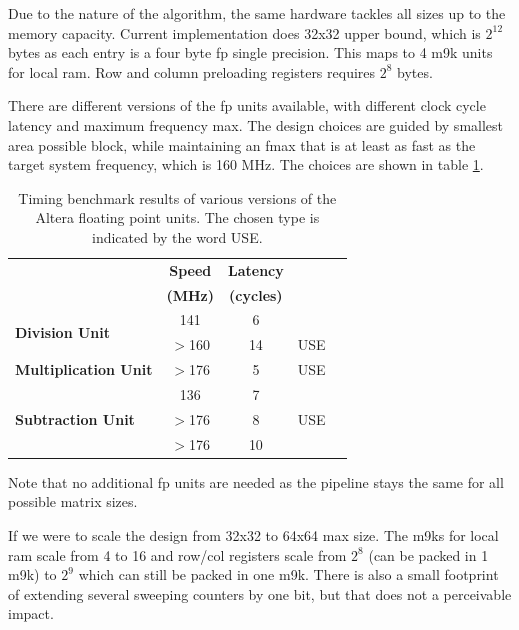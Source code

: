 \documentclass[]{article}
\begin{document}
Due to the nature of the algorithm, the same hardware tackles all sizes up to the memory capacity. Current implementation does 32x32 upper bound, which is $2^12$ bytes as each entry is a four byte fp single precision. This maps to 4 m9k units for local ram. Row and column preloading registers requires $2^8$ bytes. 

There are different versions of the fp units available, with different clock cycle latency and maximum frequency max. The design choices are guided by smallest area possible block, while maintaining an fmax that is at least as fast as the target system frequency, which is 160 MHz. The choices are shown in table \ref{tab:fp_unit_bench}.


\begin{table}[tbp]
	\caption{Timing benchmark results of various versions of the Altera floating point units. The chosen type is indicated by the word USE.}
	\label{tab:fp_unit_bench}
	\begin{center}
		\begin{tabular}{l|cccc}
		\hline

		\hline
			& \textbf{Speed} 	& \textbf{Latency} 		& \\
			& \textbf{(MHz)}		& \textbf{(cycles)} & \\
		\hline
			\multirow{2}{*}{\textbf{Division Unit}}
			& 141		& 6 	&  \\
			& $>$160 	& 14 	& USE \\
		\hline
			\textbf{Multiplication Unit}
			& $>$176 	& 5 	& USE \\
		\hline
			\multirow{3}{*}{\textbf{Subtraction Unit}}
			& 136 		& 7 	& \\
			& $>$176 	& 8  	& USE \\
			& $>$176 	& 10 	& \\
		\hline

		\hline
		\end{tabular}
	\end{center}
\end{table}


Note that no additional fp units are needed as the pipeline stays the same for all possible matrix sizes.

If we were to scale the design from 32x32 to 64x64 max size. The m9ks for local ram scale from 4 to 16 and row/col registers scale from $2^8$ (can be packed in 1 m9k) to $2^9$ which can still be packed in one m9k. There is also a small footprint of extending several sweeping counters by one bit, but that does not a perceivable impact.
\end{document}
